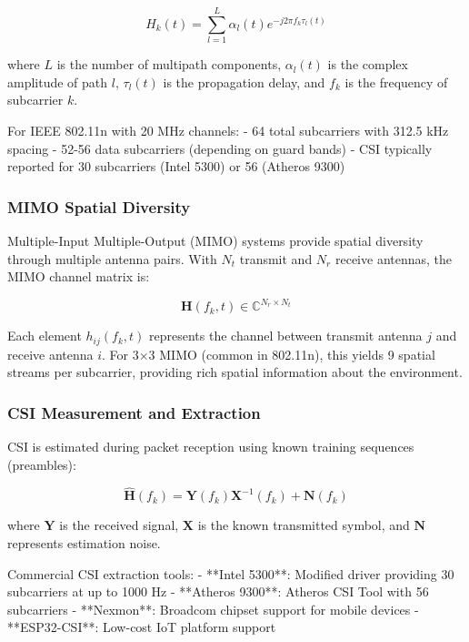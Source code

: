 \documentclass[10pt,journal,compsoc]{IEEEtran}
\begin{document}
\begin{equation}
H_k(t) = \sum_{l=1}^{L} \alpha_l(t) e^{-j2\pi f_k \tau_l(t)}
\end{equation}

where $L$ is the number of multipath components, $\alpha_l(t)$ is the complex amplitude of path $l$, $\tau_l(t)$ is the propagation delay, and $f_k$ is the frequency of subcarrier $k$.

For IEEE 802.11n with 20 MHz channels:
- 64 total subcarriers with 312.5 kHz spacing
- 52-56 data subcarriers (depending on guard bands)
- CSI typically reported for 30 subcarriers (Intel 5300) or 56 (Atheros 9300)

\subsubsection{MIMO Spatial Diversity}

Multiple-Input Multiple-Output (MIMO) systems provide spatial diversity through multiple antenna pairs. With $N_t$ transmit and $N_r$ receive antennas, the MIMO channel matrix is:

\begin{equation}
\mathbf{H}(f_k, t) \in \mathbb{C}^{N_r \times N_t}
\end{equation}

Each element $h_{ij}(f_k, t)$ represents the channel between transmit antenna $j$ and receive antenna $i$. For 3×3 MIMO (common in 802.11n), this yields 9 spatial streams per subcarrier, providing rich spatial information about the environment.

\subsubsection{CSI Measurement and Extraction}

CSI is estimated during packet reception using known training sequences (preambles):

\begin{equation}
\hat{\mathbf{H}}(f_k) = \mathbf{Y}(f_k) \mathbf{X}^{-1}(f_k) + \mathbf{N}(f_k)
\end{equation}

where $\mathbf{Y}$ is the received signal, $\mathbf{X}$ is the known transmitted symbol, and $\mathbf{N}$ represents estimation noise.

Commercial CSI extraction tools:
- **Intel 5300**: Modified driver providing 30 subcarriers at up to 1000 Hz
- **Atheros 9300**: Atheros CSI Tool with 56 subcarriers
- **Nexmon**: Broadcom chipset support for mobile devices
- **ESP32-CSI**: Low-cost IoT platform support
\end{document}
